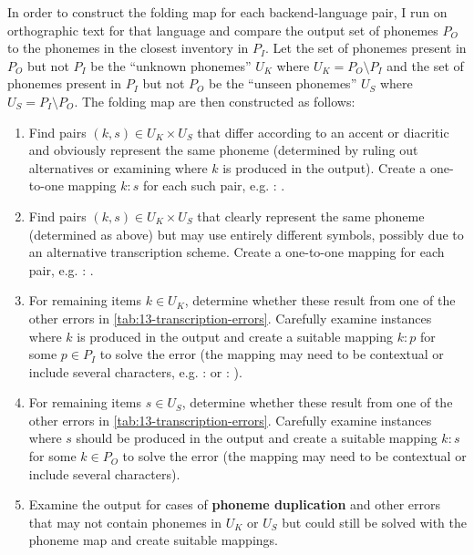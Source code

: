 In order to construct the folding map for each backend-language pair, I run \gpp on orthographic text for that language and compare the output set of phonemes $P_O$ to the phonemes in the closest inventory in \phoible $P_I$. Let the set of phonemes present in $P_O$ but not $P_I$ be the ``unknown phonemes'' $U_K$ where $U_K = P_O \setminus P_I $ and the set of phonemes present in $P_I$ but not $P_O$ be the ``unseen phonemes'' $U_S$ where $U_S = P_I \setminus P_O $. The folding map are then constructed as follows:
\begin{enumerate}
    \item Find pairs $(k,s) \in U_K \times U_S$ that differ according to an accent or diacritic and obviously represent the same phoneme (determined by ruling out alternatives or examining where $k$ is produced in the output). Create a one-to-one mapping $k:s$ for each such pair, e.g.  : .
    \item Find pairs $(k,s) \in U_K \times U_S$ that clearly represent the same phoneme (determined as above) but may use entirely different symbols, possibly due to an alternative transcription scheme. Create a one-to-one mapping for each pair, e.g.  : \ttipa{\ae}.
    \item For remaining items $k \in U_K$, determine whether these result from one of the other errors in \cref{tab:13-transcription-errors}. Carefully examine instances where $k$ is produced in the output and create a suitable mapping $k : p$ for some $p \in P_I$ to solve the error (the mapping may need to be contextual or include several characters, e.g. \ttipa{\textrhookschwa} :  or  : ). 
    \item For remaining items $s \in U_S$, determine whether these result from one of the other errors in \cref{tab:13-transcription-errors}. Carefully examine instances where $s$ should be produced in the output and create a suitable mapping $k : s$ for some $k \in P_O$ to solve the error (the mapping may need to be contextual or include several characters). 
    \item Examine the output for cases of \textbf{phoneme duplication} and other errors that may not contain phonemes in $U_K$ or $U_S$ but could still be solved with the phoneme map and create suitable mappings.
\end{enumerate}

